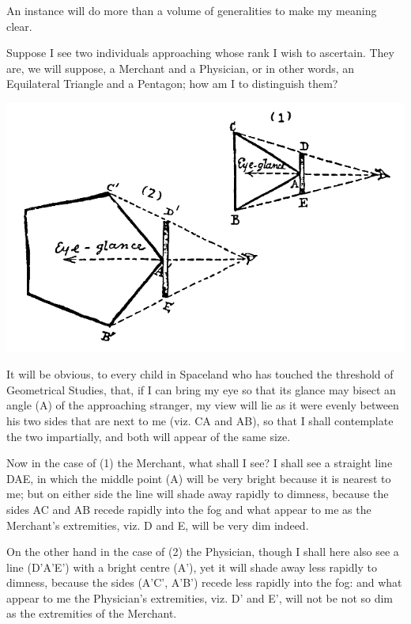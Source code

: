 \documentclass[12pt, a4paper, twoside]{memoir}
\begin{document}
An instance will do more than a volume of generalities to make my meaning
clear.

Suppose I see two individuals approaching whose rank I wish to ascertain. They
are, we will suppose, a Merchant and a Physician, or in other words, an
Equilateral Triangle and a Pentagon; how am I to distinguish them?

\includegraphics[trim=20mm 0mm 0mm 0mm, width=\linewidth]{fig3}

It will be obvious, to every child in Spaceland who has touched the threshold
of Geometrical Studies, that, if I can bring my eye so that its glance may
bisect an angle (A) of the approaching stranger, my view will lie as it were
evenly between his two sides that are next to me (viz. CA and AB), so that I
shall contemplate the two impartially, and both will appear of the same size.

Now in the case of (1) the Merchant, what shall I see? I shall see a straight
line DAE, in which the middle point (A) will be very bright because it is
nearest to me; but on either side the line will shade away rapidly to dimness,
because the sides AC and AB recede rapidly into the fog and what appear to me
as the Merchant's extremities, viz. D and E, will be very dim indeed.

On the other hand in the case of (2) the Physician, though I shall here also
see a line (D'A'E') with a bright centre (A'), yet it will shade away less
rapidly to dimness, because the sides (A'C', A'B') recede less rapidly into
the fog: and what appear to me the Physician's extremities, viz. D' and E',
will not be not so dim as the extremities of the Merchant.
\end{document}
